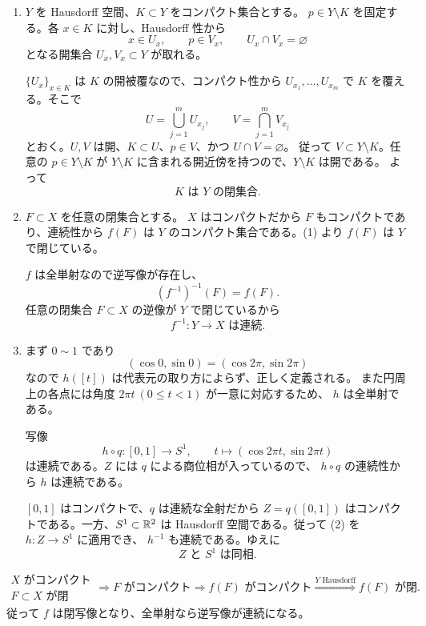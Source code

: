 \begin{enumerate}
  \item \(Y\) を Hausdorff 空間、\(K\subset Y\) をコンパクト集合とする。
  \(p\in Y\setminus K\) を固定する。各 \(x\in K\) に対し、Hausdorff 性から
  \[
  x\in U_x,\qquad p\in V_x,\qquad U_x\cap V_x=\varnothing
  \]
  となる開集合 \(U_x,V_x\subset Y\) が取れる。

  \(\{U_x\}_{x\in K}\) は \(K\) の開被覆なので、コンパクト性から
  \(U_{x_1},\ldots,U_{x_m}\) で \(K\) を覆える。そこで
  \[
  U=\bigcup_{j=1}^mU_{x_j},
  \qquad
  V=\bigcap_{j=1}^mV_{x_j}
  \]
  とおく。\(U,V\) は開、\(K\subset U\)、\(p\in V\)、かつ
  \(U\cap V=\varnothing\)。
  従って \(V\subset Y\setminus K\)。任意の \(p\in Y\setminus K\) が
  \(Y\setminus K\) に含まれる開近傍を持つので、\(Y\setminus K\) は開である。
  よって
  \[
  \boxed{K\text{ は }Y\text{ の閉集合}}.
  \]

  \item \(F\subset X\) を任意の閉集合とする。
  \(X\) はコンパクトだから \(F\) もコンパクトであり、連続性から
  \(f(F)\) は \(Y\) のコンパクト集合である。(1) より \(f(F)\) は \(Y\) で閉じている。

  \(f\) は全単射なので逆写像が存在し、
  \[
  (f^{-1})^{-1}(F)=f(F).
  \]
  任意の閉集合 \(F\subset X\) の逆像が \(Y\) で閉じているから
  \[
  \boxed{f^{-1}:Y\to X\text{ は連続}}.
  \]

  \item まず \(0\sim1\) であり
  \[
  (\cos0,\sin0)=(\cos2\pi,\sin2\pi)
  \]
  なので \(h([t])\) は代表元の取り方によらず、正しく定義される。
  また円周上の各点には角度 \(2\pi t\ (0\le t<1)\) が一意に対応するため、
  \(h\) は全単射である。

  写像
  \[
  h\circ q:[0,1]\to S^1,
  \qquad
  t\longmapsto(\cos2\pi t,\sin2\pi t)
  \]
  は連続である。\(Z\) には \(q\) による商位相が入っているので、
  \(h\circ q\) の連続性から \(h\) は連続である。

  \([0,1]\) はコンパクトで、\(q\) は連続な全射だから
  \(Z=q([0,1])\) はコンパクトである。一方、\(S^1\subset\mathbb R^2\) は
  Hausdorff 空間である。従って (2) を \(h:Z\to S^1\) に適用でき、
  \(h^{-1}\) も連続である。ゆえに
  \[
  \boxed{Z\text{ と }S^1\text{ は同相}}.
  \]
\end{enumerate}

\begin{pointbox}[証明のつながり]
\[
\begin{array}{c}
X\text{ がコンパクト}\\[-1mm]
F\subset X\text{ が閉}
\end{array}
\Longrightarrow
F\text{ がコンパクト}
\Longrightarrow
f(F)\text{ がコンパクト}
\overset{Y\text{ Hausdorff}}{\Longrightarrow}
f(F)\text{ が閉}.
\]
従って \(f\) は閉写像となり、全単射なら逆写像が連続になる。
\end{pointbox}

